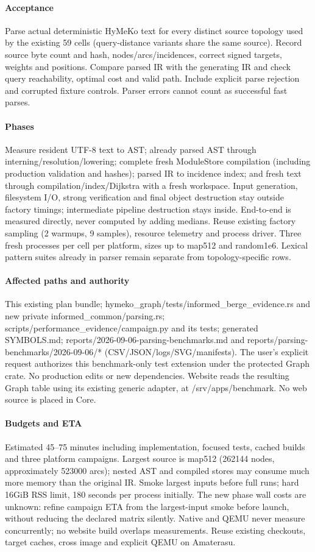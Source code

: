 \documentclass{article}
\begin{document}
\paragraph{Acceptance} Parse actual deterministic HyMeKo text for every distinct
source topology used by the existing 59 cells (query-distance variants share the
same source). Record source byte count and hash, nodes/arcs/incidences, correct
signed targets, weights and positions. Compare parsed IR with the generating IR
and check query reachability, optimal cost and valid path. Include explicit
parse rejection and corrupted fixture controls. Parser errors cannot count as
successful fast parses.
\paragraph{Phases} Measure resident UTF-8 text to AST; already parsed AST through
interning/resolution/lowering; complete fresh ModuleStore compilation (including
production validation and hashes); parsed IR to incidence index; and fresh
text through compilation/index/Dijkstra with a fresh workspace. Input generation,
filesystem I/O, strong verification and final object destruction stay outside
factory timings; intermediate pipeline destruction stays inside. End-to-end is
measured directly, never computed by adding medians. Reuse existing factory
sampling (2 warmups, 9 samples), resource telemetry and process driver. Three
fresh processes per cell per platform, sizes up to map512 and random1e6. Lexical
pattern suites already in parser remain separate from topology-specific rows.
\paragraph{Affected paths and authority} This existing plan bundle;
hymeko\_graph/tests/informed\_berge\_evidence.rs and new private
informed\_common/parsing.rs; scripts/performance\_evidence/campaign.py and its
tests; generated SYMBOLS.md; reports/2026-09-06-parsing-benchmarks.md and
reports/parsing-benchmarks/2026-09-06/* (CSV/JSON/logs/SVG/manifests).
The user's explicit request authorizes this benchmark-only test extension under
the protected Graph crate. No production edits or new dependencies. Website
reads the resulting Graph table using its existing generic adapter, at
/srv/apps/benchmark. No web source is placed in Core.
\paragraph{Budgets and ETA} Estimated 45--75 minutes including implementation,
focused tests, cached builds and three platform campaigns. Largest source is
map512 (262144 nodes, approximately 523000 arcs); nested AST and compiled stores
may consume much more memory than the original IR. Smoke largest inputs before
full runs; hard 16GiB RSS limit, 180 seconds per process initially. The new phase
wall costs are unknown: refine campaign ETA from the largest-input smoke before
launch, without reducing the declared matrix silently. Native and QEMU never
measure concurrently; no website build overlaps measurements. Reuse existing
checkouts, target caches, cross image and explicit QEMU on Amaterasu.
\end{document}

